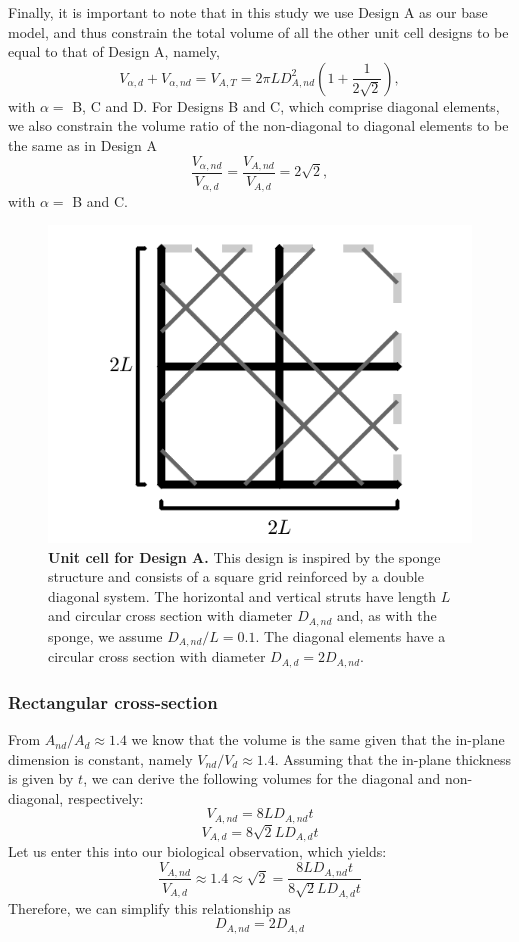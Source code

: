 \documentclass[10pt,twoside]{fernandes_supp}
\begin{document}
Finally, it is important to note that in this study we use Design A as our base model, and thus constrain the total volume of all the other unit cell designs to be equal to that of Design A, namely,
\begin{equation}\label{con1}
V_{\alpha,d}+V_{\alpha,nd}={V}_{A,T}=2\pi L D_{A,nd}^2 \left(1+\frac{1}{2\sqrt{2}}\right),
\end{equation}
with $\alpha=$ B, C and D.
For Designs B and C, which comprise diagonal elements, we also  constrain the volume ratio of the non-diagonal to diagonal elements to be the same as in Design A
\begin{equation}\label{con2}
\frac{V_{\alpha,nd}}{V_{\alpha,d}}=\frac{V_{A,nd}}{V_{A,d}}=2\sqrt{2},
\end{equation}
with $\alpha=$ B and C.

\begin{figure}[H]
    \centering
    \includegraphics[width=0.4\linewidth]{SFig2.png}
    \caption{{\bf Unit cell for Design A.} This design is inspired by the sponge structure and consists of a square grid  reinforced by a double diagonal system. The horizontal and vertical struts have length $L$ and circular cross section with diameter $D_{A,nd}$ and, as with the sponge, we assume $D_{A,nd}/L=0.1$. The diagonal elements have a circular cross section  with diameter $D_{A,d}=2 D_{A,nd}$.}
    \label{DesignA}
\end{figure}

\subsubsection{Rectangular cross-section}
From $A_{nd}/A_d\approx 1.4$ we know that the volume is the same given that the in-plane dimension is constant, namely $V_{nd}/V_d\approx 1.4$. Assuming that the in-plane thickness is given by $t$, we can derive the following volumes for the diagonal and non-diagonal, respectively:
\begin{equation}
	V_{A,nd}=8LD_{A,nd}t
\end{equation}
\begin{equation}
	V_{A,d}=8\sqrt{2}LD_{A,d}t
\end{equation}
Let us enter this into our biological observation, which yields:
\begin{equation}
	\frac{V_{A,nd}}{V_{A,d}}\approx 1.4\approx\sqrt{2}=\frac{8LD_{A,nd}t}{8\sqrt{2}LD_{A,d}t}
\end{equation}
Therefore, we can simplify this relationship as
\begin{equation}
	D_{A,nd}=2D_{A,d}
\end{equation}
\end{document}
